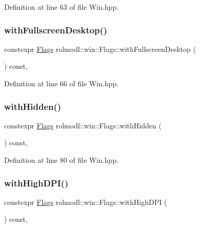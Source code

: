 Definition at line 63 of file Win.\+hpp.

\mbox{\label{structrolmodl_1_1win_1_1_flags_ae8fbe3a0abf4f19ba3fe1e331b162acf}} 
\subsubsection{\texorpdfstring{withFullscreenDesktop()}{withFullscreenDesktop()}}
{\footnotesize\ttfamily constexpr \mbox{\hyperlink{structrolmodl_1_1win_1_1_flags}{Flags}} rolmodl\+::win\+::\+Flags\+::with\+Fullscreen\+Desktop (\begin{DoxyParamCaption}{ }\end{DoxyParamCaption}) const\hspace{0.3cm}{\ttfamily [inline]}, {\ttfamily [noexcept]}}



Definition at line 66 of file Win.\+hpp.

\mbox{\label{structrolmodl_1_1win_1_1_flags_a237439315fcc5ecafeab0eae304b1fab}} 
\subsubsection{\texorpdfstring{withHidden()}{withHidden()}}
{\footnotesize\ttfamily constexpr \mbox{\hyperlink{structrolmodl_1_1win_1_1_flags}{Flags}} rolmodl\+::win\+::\+Flags\+::with\+Hidden (\begin{DoxyParamCaption}{ }\end{DoxyParamCaption}) const\hspace{0.3cm}{\ttfamily [inline]}, {\ttfamily [noexcept]}}



Definition at line 80 of file Win.\+hpp.

\mbox{\label{structrolmodl_1_1win_1_1_flags_aab0e6903ddcb42c61a26dd0dcc8a702a}} 
\subsubsection{\texorpdfstring{withHighDPI()}{withHighDPI()}}
{\footnotesize\ttfamily constexpr \mbox{\hyperlink{structrolmodl_1_1win_1_1_flags}{Flags}} rolmodl\+::win\+::\+Flags\+::with\+High\+D\+PI (\begin{DoxyParamCaption}{ }\end{DoxyParamCaption}) const\hspace{0.3cm}{\ttfamily [inline]}, {\ttfamily [noexcept]}}



